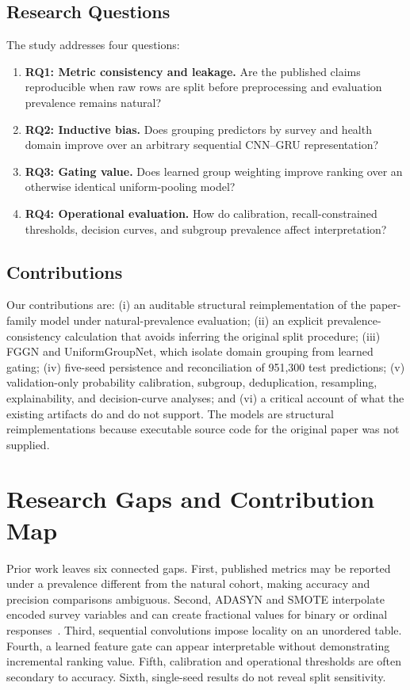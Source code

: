 \documentclass[conference,10pt]{IEEEtran}
\begin{document}
\subsection{Research Questions}
The study addresses four questions:
\begin{enumerate}
    \item \textbf{RQ1: Metric consistency and leakage.} Are the published claims reproducible when raw rows are split before preprocessing and evaluation prevalence remains natural?
    \item \textbf{RQ2: Inductive bias.} Does grouping predictors by survey and health domain improve over an arbitrary sequential CNN--GRU representation?
    \item \textbf{RQ3: Gating value.} Does learned group weighting improve ranking over an otherwise identical uniform-pooling model?
    \item \textbf{RQ4: Operational evaluation.} How do calibration, recall-constrained thresholds, decision curves, and subgroup prevalence affect interpretation?
\end{enumerate}

\subsection{Contributions}
Our contributions are: (i) an auditable structural reimplementation of the paper-family model under natural-prevalence evaluation; (ii) an explicit prevalence-consistency calculation that avoids inferring the original split procedure; (iii) FGGN and UniformGroupNet, which isolate domain grouping from learned gating; (iv) five-seed persistence and reconciliation of 951,300 test predictions; (v) validation-only probability calibration, subgroup, deduplication, resampling, explainability, and decision-curve analyses; and (vi) a critical account of what the existing artifacts do and do not support. The models are structural reimplementations because executable source code for the original paper was not supplied.

\section{Research Gaps and Contribution Map}
Prior work leaves six connected gaps. First, published metrics may be reported under a prevalence different from the natural cohort, making accuracy and precision comparisons ambiguous. Second, ADASYN and SMOTE interpolate encoded survey variables and can create fractional values for binary or ordinal responses~\cite{chawla2002smote,he2008adasyn}. Third, sequential convolutions impose locality on an unordered table. Fourth, a learned feature gate can appear interpretable without demonstrating incremental ranking value. Fifth, calibration and operational thresholds are often secondary to accuracy. Sixth, single-seed results do not reveal split sensitivity.
\end{document}
